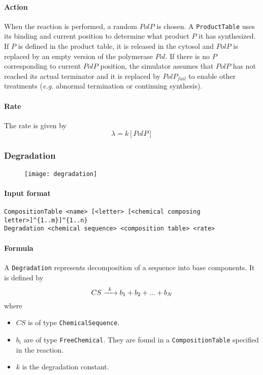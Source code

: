 \paragraph{Action} When the reaction is performed, a random $PolP$ is chosen. A \texttt{ProductTable} uses its binding and current position to determine what product $P$ it has synthesized. If $P$ is defined in the product table, it is released in the cytosol and $PolP$ is replaced by an empty version of the polymerase $Pol$. If there is no $P$ corresponding to current $PolP$ position, the simulator assumes that $PolP$ has not reached its actual terminator and it is replaced by $PolP_{fail}$ to enable other treatments (\textit{e.g.} abnormal termination or continuing synthesis).

\paragraph{Rate} The rate is given by
\[
\lambda = k[PolP]
\]

\subsubsection{Degradation}

\begin{figure}[!ht]
	\centering
	\texttt{[image: degradation]}
\end{figure}

\paragraph{Input format}
\begin{verbatim}
CompositionTable <name> [<letter> [<chemical composing letter>]^{1..m}]^{1..n}
Degradation <chemical sequence> <composition table> <rate>	
\end{verbatim}

\paragraph{Formula} A \texttt{Degradation} represents decomposition of a sequence into base components. It is defined by
\[
\reactionIrr{CS}{b_1 + b_2 + ... + b_N}{k}{}
\]
where
\begin{itemize}
	\item $CS$ is of type \texttt{ChemicalSequence}.
	\item $b_i$ are of type \texttt{FreeChemical}. They are found in a \texttt{CompositionTable} specified in the reaction.
	\item $k$ is the degradation constant.
\end{itemize}

